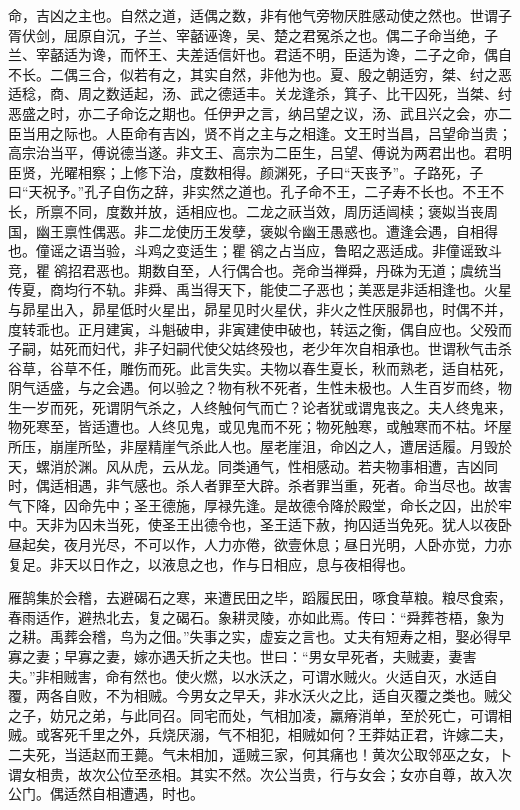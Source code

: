 \documentclass[]{article}
\begin{document}
命，吉凶之主也。自然之道，适偶之数，非有他气旁物厌胜感动使之然也。世谓子胥伏剑，屈原自沉，子兰、宰嚭诬谗，吴、楚之君冤杀之也。偶二子命当绝，子兰、宰嚭适为谗，而怀王、夫差适信奸也。君适不明，臣适为谗，二子之命，偶自不长。二偶三合，似若有之，其实自然，非他为也。夏、殷之朝适穷，桀、纣之恶适稔，商、周之数适起，汤、武之德适丰。关龙逢杀，箕子、比干囚死，当桀、纣恶盛之时，亦二子命讫之期也。任伊尹之言，纳吕望之议，汤、武且兴之会，亦二臣当用之际也。人臣命有吉凶，贤不肖之主与之相逢。文王时当昌，吕望命当贵；高宗治当平，傅说德当遂。非文王、高宗为二臣生，吕望、傅说为两君出也。君明臣贤，光曜相察；上修下治，度数相得。颜渊死，子曰``天丧予''。子路死，子曰``天祝予。''孔子自伤之辞，非实然之道也。孔子命不王，二子寿不长也。不王不长，所禀不同，度数并放，适相应也。二龙之祆当效，周历适闿椟；褒姒当丧周国，幽王禀性偶恶。非二龙使历王发孽，褒姒令幽王愚惑也。遭逢会遇，自相得也。僮谣之语当验，斗鸡之变适生；瞿鹆之占当应，鲁昭之恶适成。非僮谣致斗竞，瞿鹆招君恶也。期数自至，人行偶合也。尧命当禅舜，丹硃为无道；虞统当传夏，商均行不轨。非舜、禹当得天下，能使二子恶也；美恶是非适相逢也。火星与昴星出入，昴星低时火星出，昴星见时火星伏，非火之性厌服昴也，时偶不并，度转乖也。正月建寅，斗魁破申，非寅建使申破也，转运之衡，偶自应也。父殁而子嗣，姑死而妇代，非子妇嗣代使父姑终殁也，老少年次自相承也。世谓秋气击杀谷草，谷草不任，雕伤而死。此言失实。夫物以春生夏长，秋而熟老，适自枯死，阴气适盛，与之会遇。何以验之？物有秋不死者，生性未极也。人生百岁而终，物生一岁而死，死谓阴气杀之，人终触何气而亡？论者犹或谓鬼丧之。夫人终鬼来，物死寒至，皆适遭也。人终见鬼，或见鬼而不死；物死触寒，或触寒而不枯。坏屋所压，崩崖所坠，非屋精崖气杀此人也。屋老崖沮，命凶之人，遭居适履。月毁於天，螺消於渊。风从虎，云从龙。同类通气，性相感动。若夫物事相遭，吉凶同时，偶适相遇，非气感也。杀人者罪至大辟。杀者罪当重，死者。命当尽也。故害气下降，囚命先中；圣王德施，厚禄先逢。是故德令降於殿堂，命长之囚，出於牢中。天非为囚未当死，使圣王出德令也，圣王适下赦，拘囚适当免死。犹人以夜卧昼起矣，夜月光尽，不可以作，人力亦倦，欲壹休息；昼日光明，人卧亦觉，力亦复足。非天以日作之，以液息之也，作与日相应，息与夜相得也。

雁鹄集於会稽，去避碣石之寒，来遭民田之毕，蹈履民田，啄食草粮。粮尽食索，春雨适作，避热北去，复之碣石。象耕灵陵，亦如此焉。传曰：``舜葬苍梧，象为之耕。禹葬会稽，鸟为之佃。''失事之实，虚妄之言也。丈夫有短寿之相，娶必得早寡之妻；早寡之妻，嫁亦遇夭折之夫也。世曰：``男女早死者，夫贼妻，妻害夫。''非相贼害，命有然也。使火燃，以水沃之，可谓水贼火。火适自灭，水适自覆，两各自败，不为相贼。今男女之早夭，非水沃火之比，适自灭覆之类也。贼父之子，妨兄之弟，与此同召。同宅而处，气相加凌，羸瘠消单，至於死亡，可谓相贼。或客死千里之外，兵烧厌溺，气不相犯，相贼如何？王莽姑正君，许嫁二夫，二夫死，当适赵而王薨。气未相加，遥贼三家，何其痛也！黄次公取邻巫之女，卜谓女相贵，故次公位至丞相。其实不然。次公当贵，行与女会；女亦自尊，故入次公门。偶适然自相遭遇，时也。
\end{document}
